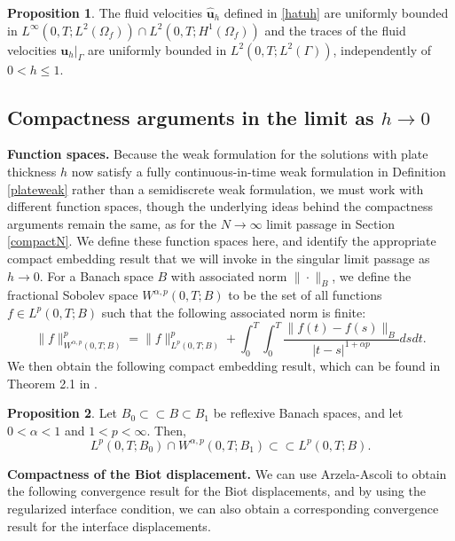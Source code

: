 \documentclass[11pt]{article}
\newcommand{\bd}{\boldsymbol}
\theoremstyle{definition}
\newtheorem{proposition}{Proposition}[section]
\begin{document}
\begin{proposition}\label{tracehuniform}
The fluid velocities $\hat{\bd{u}}_{h}$ defined in \eqref{hatuh} are uniformly bounded in $L^{\infty}(0, T; L^{2}(\Omega_{f})) \cap L^{2}(0, T; H^{1}(\Omega_{f}))$ and the traces of the fluid velocities $\bd{u}_{h}|_{\Gamma}$ are uniformly bounded in $L^{2}(0, T; L^{2}(\Gamma))$, independently of $0 < h \le 1$. 
\end{proposition}

\subsection{Compactness arguments in the limit as $h \to 0$}

\noindent \textbf{Function spaces.} Because the weak formulation for the solutions with plate thickness $h$ now satisfy a fully continuous-in-time weak formulation in Definition \ref{plateweak} rather than a semidiscrete weak formulation, we must work with different function spaces, though the underlying ideas behind the compactness arguments remain the same, as for the $N \to \infty$ limit passage in Section \ref{compactN}. We define these function spaces here, and identify the appropriate compact embedding result that we will invoke in the singular limit passage as $h \to 0$. For a Banach space $B$ with associated norm $\|\cdot\|_{B}$, we define the fractional Sobolev space $W^{\alpha, p}(0, T; B)$ to be the set of all functions $f \in L^{p}(0, T; B)$ such that the following associated norm is finite:
\begin{equation}\label{fractionalnorm}
\|f\|_{W^{\alpha, p}(0, T; B)}^{p} = \|f\|_{L^{p}(0, T; B)}^{p} + \int_{0}^{T} \int_{0}^{T} \frac{\|f(t) - f(s)\|_{B}}{|t - s|^{1 + \alpha p}} ds dt.
\end{equation}
We then obtain the following compact embedding result, which can be found in Theorem 2.1 in \cite{FlandoliGatarek}.

\begin{proposition}\label{compactness}
Let $B_{0} \subset \subset B \subset B_{1}$ be reflexive Banach spaces, and let $0 < \alpha < 1$ and $1 < p < \infty$. Then,
\begin{equation*}
L^{p}(0, T; B_{0}) \cap W^{\alpha, p}(0, T; B_{1}) \subset \subset L^{p}(0, T; B).
\end{equation*}
\end{proposition}

\medskip

\noindent \textbf{Compactness of the Biot displacement.} We can use Arzela-Ascoli to obtain the following convergence result for the Biot displacements, and by using the regularized interface condition, we can also obtain a corresponding convergence result for the interface displacements.
\end{document}
